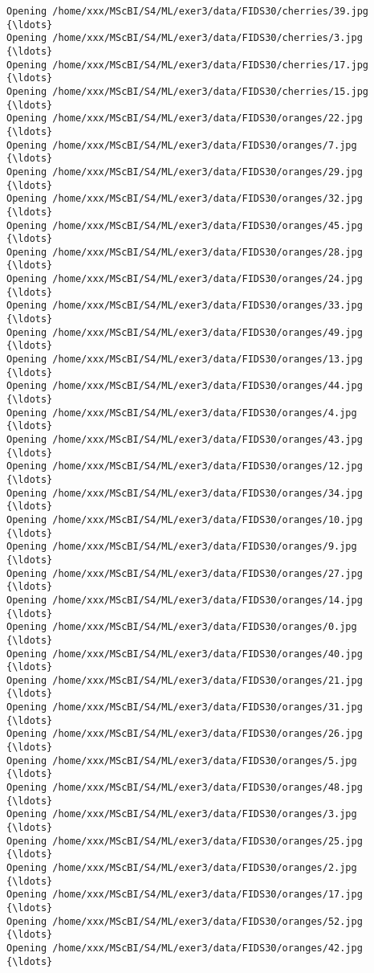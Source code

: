 \documentclass[11pt]{article}
\begin{document}
\begin{Verbatim}[commandchars=\\\{\}]
Opening /home/xxx/MScBI/S4/ML/exer3/data/FIDS30/cherries/39.jpg  {\ldots}
Opening /home/xxx/MScBI/S4/ML/exer3/data/FIDS30/cherries/3.jpg  {\ldots}
Opening /home/xxx/MScBI/S4/ML/exer3/data/FIDS30/cherries/17.jpg  {\ldots}
Opening /home/xxx/MScBI/S4/ML/exer3/data/FIDS30/cherries/15.jpg  {\ldots}
Opening /home/xxx/MScBI/S4/ML/exer3/data/FIDS30/oranges/22.jpg  {\ldots}
Opening /home/xxx/MScBI/S4/ML/exer3/data/FIDS30/oranges/7.jpg  {\ldots}
Opening /home/xxx/MScBI/S4/ML/exer3/data/FIDS30/oranges/29.jpg  {\ldots}
Opening /home/xxx/MScBI/S4/ML/exer3/data/FIDS30/oranges/32.jpg  {\ldots}
Opening /home/xxx/MScBI/S4/ML/exer3/data/FIDS30/oranges/45.jpg  {\ldots}
Opening /home/xxx/MScBI/S4/ML/exer3/data/FIDS30/oranges/28.jpg  {\ldots}
Opening /home/xxx/MScBI/S4/ML/exer3/data/FIDS30/oranges/24.jpg  {\ldots}
Opening /home/xxx/MScBI/S4/ML/exer3/data/FIDS30/oranges/33.jpg  {\ldots}
Opening /home/xxx/MScBI/S4/ML/exer3/data/FIDS30/oranges/49.jpg  {\ldots}
Opening /home/xxx/MScBI/S4/ML/exer3/data/FIDS30/oranges/13.jpg  {\ldots}
Opening /home/xxx/MScBI/S4/ML/exer3/data/FIDS30/oranges/44.jpg  {\ldots}
Opening /home/xxx/MScBI/S4/ML/exer3/data/FIDS30/oranges/4.jpg  {\ldots}
Opening /home/xxx/MScBI/S4/ML/exer3/data/FIDS30/oranges/43.jpg  {\ldots}
Opening /home/xxx/MScBI/S4/ML/exer3/data/FIDS30/oranges/12.jpg  {\ldots}
Opening /home/xxx/MScBI/S4/ML/exer3/data/FIDS30/oranges/34.jpg  {\ldots}
Opening /home/xxx/MScBI/S4/ML/exer3/data/FIDS30/oranges/10.jpg  {\ldots}
Opening /home/xxx/MScBI/S4/ML/exer3/data/FIDS30/oranges/9.jpg  {\ldots}
Opening /home/xxx/MScBI/S4/ML/exer3/data/FIDS30/oranges/27.jpg  {\ldots}
Opening /home/xxx/MScBI/S4/ML/exer3/data/FIDS30/oranges/14.jpg  {\ldots}
Opening /home/xxx/MScBI/S4/ML/exer3/data/FIDS30/oranges/0.jpg  {\ldots}
Opening /home/xxx/MScBI/S4/ML/exer3/data/FIDS30/oranges/40.jpg  {\ldots}
Opening /home/xxx/MScBI/S4/ML/exer3/data/FIDS30/oranges/21.jpg  {\ldots}
Opening /home/xxx/MScBI/S4/ML/exer3/data/FIDS30/oranges/31.jpg  {\ldots}
Opening /home/xxx/MScBI/S4/ML/exer3/data/FIDS30/oranges/26.jpg  {\ldots}
Opening /home/xxx/MScBI/S4/ML/exer3/data/FIDS30/oranges/5.jpg  {\ldots}
Opening /home/xxx/MScBI/S4/ML/exer3/data/FIDS30/oranges/48.jpg  {\ldots}
Opening /home/xxx/MScBI/S4/ML/exer3/data/FIDS30/oranges/3.jpg  {\ldots}
Opening /home/xxx/MScBI/S4/ML/exer3/data/FIDS30/oranges/25.jpg  {\ldots}
Opening /home/xxx/MScBI/S4/ML/exer3/data/FIDS30/oranges/2.jpg  {\ldots}
Opening /home/xxx/MScBI/S4/ML/exer3/data/FIDS30/oranges/17.jpg  {\ldots}
Opening /home/xxx/MScBI/S4/ML/exer3/data/FIDS30/oranges/52.jpg  {\ldots}
Opening /home/xxx/MScBI/S4/ML/exer3/data/FIDS30/oranges/42.jpg  {\ldots}

\end{Verbatim}
\end{document}
